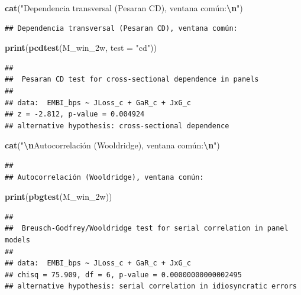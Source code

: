 \documentclass[
]{article}
\newenvironment{Shaded}{\begin{snugshade}}{\end{snugshade}}
\newcommand{\AttributeTok}[1]{\textcolor[rgb]{0.13,0.29,0.53}{#1}}
\newcommand{\FunctionTok}[1]{\textcolor[rgb]{0.13,0.29,0.53}{\textbf{#1}}}
\newcommand{\NormalTok}[1]{#1}
\newcommand{\SpecialCharTok}[1]{\textcolor[rgb]{0.81,0.36,0.00}{\textbf{#1}}}
\newcommand{\StringTok}[1]{\textcolor[rgb]{0.31,0.60,0.02}{#1}}
\begin{document}
\begin{Shaded}
\begin{Highlighting}[]
\FunctionTok{cat}\NormalTok{(}\StringTok{"Dependencia transversal (Pesaran CD), ventana común:}\SpecialCharTok{\textbackslash{}n}\StringTok{"}\NormalTok{)}
\end{Highlighting}
\end{Shaded}

\begin{verbatim}
## Dependencia transversal (Pesaran CD), ventana común:
\end{verbatim}

\begin{Shaded}
\begin{Highlighting}[]
\FunctionTok{print}\NormalTok{(}\FunctionTok{pcdtest}\NormalTok{(M\_win\_2w, }\AttributeTok{test =} \StringTok{"cd"}\NormalTok{))}
\end{Highlighting}
\end{Shaded}

\begin{verbatim}
## 
##  Pesaran CD test for cross-sectional dependence in panels
## 
## data:  EMBI_bps ~ JLoss_c + GaR_c + JxG_c
## z = -2.812, p-value = 0.004924
## alternative hypothesis: cross-sectional dependence
\end{verbatim}

\begin{Shaded}
\begin{Highlighting}[]
\FunctionTok{cat}\NormalTok{(}\StringTok{"}\SpecialCharTok{\textbackslash{}n}\StringTok{Autocorrelación (Wooldridge), ventana común:}\SpecialCharTok{\textbackslash{}n}\StringTok{"}\NormalTok{)}
\end{Highlighting}
\end{Shaded}

\begin{verbatim}
## 
## Autocorrelación (Wooldridge), ventana común:
\end{verbatim}

\begin{Shaded}
\begin{Highlighting}[]
\FunctionTok{print}\NormalTok{(}\FunctionTok{pbgtest}\NormalTok{(M\_win\_2w))}
\end{Highlighting}
\end{Shaded}

\begin{verbatim}
## 
##  Breusch-Godfrey/Wooldridge test for serial correlation in panel models
## 
## data:  EMBI_bps ~ JLoss_c + GaR_c + JxG_c
## chisq = 75.909, df = 6, p-value = 0.00000000000002495
## alternative hypothesis: serial correlation in idiosyncratic errors
\end{verbatim}
\end{document}
